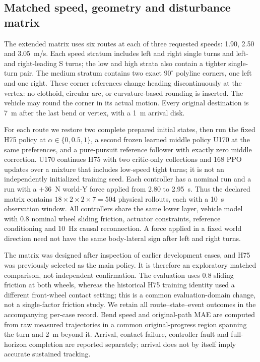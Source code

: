 \documentclass[final,5p,times,twocolumn]{elsarticle}
\begin{document}
\subsection{Matched speed, geometry and disturbance matrix}
The extended matrix uses six routes at each of three requested speeds: 1.90, 2.50 and 3.05~m/s. Each speed stratum includes left and right single turns and left- and right-leading S turns; the low and high strata also contain a tighter single-turn pair. The medium stratum contains two exact $90^\circ$ polyline corners, one left and one right. These corner references change heading discontinuously at the vertex: no clothoid, circular arc, or curvature-based rounding is inserted. The vehicle may round the corner in its actual motion. Every original destination is 7~m after the last bend or vertex, with a 1~m arrival disk.

For each route we restore two complete prepared initial states, then run the fixed H75 policy at $\alpha\in\{0,0.5,1\}$, a second frozen learned middle policy U170 at the same preferences, and a pure-pursuit reference follower with exactly zero middle correction. U170 continues H75 with two critic-only collections and 168 PPO updates over a mixture that includes low-speed tight turns; it is not an independently initialized training seed. Each controller has a nominal run and a run with a $+36$~N world-Y force applied from 2.80 to 2.95~s. Thus the declared matrix contains $18\times2\times2\times7=504$ physical rollouts, each with a 10~s observation window. All controllers share the same lower layer, vehicle model with 0.8 nominal wheel sliding friction, actuator constraints, reference conditioning and 10~Hz causal reconnection. A force applied in a fixed world direction need not have the same body-lateral sign after left and right turns.

The matrix was designed after inspection of earlier development cases, and H75 was previously selected as the main policy. It is therefore an exploratory matched comparison, not independent confirmation. The evaluation uses 0.8 sliding friction at both wheels, whereas the historical H75 training identity used a different front-wheel contact setting; this is a common evaluation-domain change, not a single-factor friction study. We retain all route--state--event outcomes in the accompanying per-case record. Bend speed and original-path MAE are computed from raw measured trajectories in a common original-progress region spanning the turn and 2~m beyond it. Arrival, contact failure, controller fault and full-horizon completion are reported separately; arrival does not by itself imply accurate sustained tracking.
\end{document}
